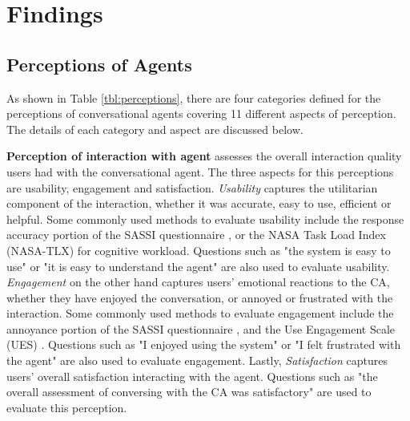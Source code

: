 
\section{Findings}

\subsection{Perceptions of Agents}

As shown in Table \ref{tbl:perceptions}, there are four categories defined for the perceptions of conversational agents covering 11 different aspects of perception. The details of each category and aspect are discussed below.

\textbf{Perception of interaction with agent} assesses the overall interaction quality users had with the conversational agent. The three aspects for this perceptions are usability, engagement and satisfaction. \textit{Usability} captures the utilitarian component of the interaction, whether it was accurate, easy to use, efficient or helpful. Some commonly used methods to evaluate usability include the response accuracy portion of the SASSI questionnaire \cite{hone2000towards}, or the NASA Task Load Index (NASA-TLX) \cite{hart1988development} for cognitive workload. Questions such as "the system is easy to use" or "it is easy to understand the agent" are also used to evaluate usability. \textit{Engagement} on the other hand captures users' emotional reactions to the CA, whether they have enjoyed the conversation, or annoyed or frustrated with the interaction. Some commonly used methods to evaluate engagement include the annoyance portion of the SASSI questionnaire \cite{hone2000towards}, and the Use Engagement Scale (UES) \cite{o2018practical}. Questions such as "I enjoyed using the system" or "I felt frustrated with the agent" are also used to evaluate engagement. Lastly, \textit{Satisfaction} captures users' overall satisfaction interacting with the agent. Questions such as "the overall assessment of conversing with the CA was satisfactory" are used to evaluate this perception.

